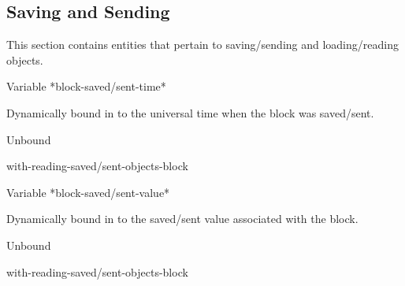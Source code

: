 \documentclass[10pt,twoside,english,pdftex]{article}
\begin{document}
\T\markright{}%
\T\pagestyle{plain}
\T\clearpage
\W{}
\T\pagestyle{fancy}
\T\thispagestyle{fancybottom}
\T\global\def\fnlastname{ }%

\subsection{Saving and Sending}
\label{sec:saving-sending}%

This section contains  entities that pertain to
saving/sending and loading/reading objects.

\W\entities
\T\clearpage


\begin{functiondoc}{Variable}%
{*block-saved/sent-time*}{}%

\fnsyntax

\fnpurpose Dynamically bound in
 to the
universal time when the block was saved/sent.

\fnpackage {}

\fnmodule {}

\fninitialvalue Unbound

\begin{alsos}{with-reading-saved/sent-objects-block}
\end{alsos}

\end{functiondoc}


\begin{functiondoc}{Variable}%
{*block-saved/sent-value*}{}%

\fnsyntax

\fnpurpose Dynamically bound in
 to the
saved/sent value associated with the block.

\fnpackage {}

\fnmodule {}

\fninitialvalue Unbound

\begin{alsos}{with-reading-saved/sent-objects-block}
\end{alsos}

\end{functiondoc}
\end{document}
